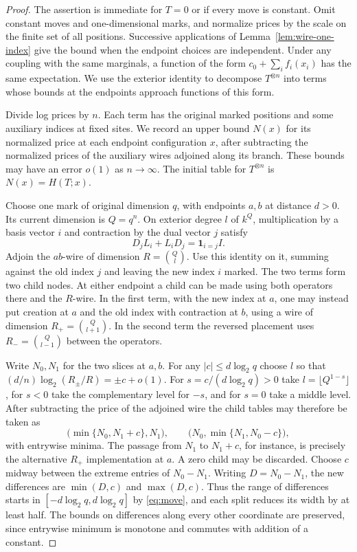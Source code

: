 \begin{proof}
The assertion is immediate for $T=0$ or if every move is constant.
Omit constant moves and one-dimensional marks, and normalize prices by
the scale on the finite set of all positions. Successive applications
of Lemma~\ref{lem:wire-one-index} give the bound when the endpoint
choices are independent. Under any coupling with the same marginals,
a function of the form $c_0+\sum_i f_i(x_i)$ has the same expectation.
We use the exterior identity to decompose $T^{\otimes n}$ into terms
whose bounds at the endpoints approach functions of this form.

Divide log prices by $n$. Each term has the original marked positions
and some auxiliary indices at fixed sites. We record an upper bound
$N(x)$ for its normalized price at each endpoint configuration $x$,
after subtracting the normalized prices of the auxiliary wires adjoined
along its branch. These bounds may have an error $o(1)$ as $n\to\infty$.
The initial table for $T^{\otimes n}$ is $N(x)=H(T;x)$.

Choose one mark of original dimension $q$, with endpoints $a,b$ at
distance $d>0$. Its current dimension is $Q=q^n$. On exterior
degree $l$ of $k^Q$, multiplication by a basis vector $i$ and
contraction by the dual vector $j$ satisfy
\[
                 D_jL_i+L_iD_j=\mathbf 1_{i=j} I .
\]
Adjoin the $ab$-wire of dimension $R=\binom Ql$. Use this identity on
it, summing against the old index $j$ and leaving the new index $i$
marked. The two terms form two child nodes. At either endpoint a child
can be made using both operators there and the $R$-wire. In the first
term, with the new index at $a$, one may instead put creation at $a$
and the old index with contraction at $b$, using a wire of dimension
$R_+=\binom Q{l+1}$. In the second term the reversed placement uses
$R_-=\binom Q{l-1}$ between the operators.

Write $N_0,N_1$ for the two slices at $a,b$. For any
$|c|\le d\log_2 q$ choose $l$ so that
$(d/n)\log_2(R_\pm/R)=\pm c+o(1)$. For $s=c/(d\log_2 q)>0$ take
$l=\lfloor Q^{1-s}\rfloor$, for $s<0$ take the complementary level
for $-s$, and for $s=0$ take a middle level. After subtracting the
price of the adjoined wire the child tables may therefore be taken as
\[
 \bigl(\min\{N_0,N_1+c\},N_1\bigr),\qquad
 \bigl(N_0,\min\{N_1,N_0-c\}\bigr),
\]
with entrywise minima. The passage from $N_1$ to $N_1+c$, for instance, is precisely the alternative $R_+$ implementation at $a$.
A zero child may be discarded.
Choose $c$ midway between the extreme entries of $N_0-N_1$. Writing $D=N_0-N_1$, the new differences are $\min(D,c)$ and
$\max(D,c)$. Thus the range of differences starts in
$[-d\log_2 q,d\log_2 q]$ by \eqref{eq:move}, and each split reduces
its width by at least half. The bounds on differences along every other
coordinate are preserved, since entrywise minimum is monotone and
commutes with addition of a constant.


\end{proof}
